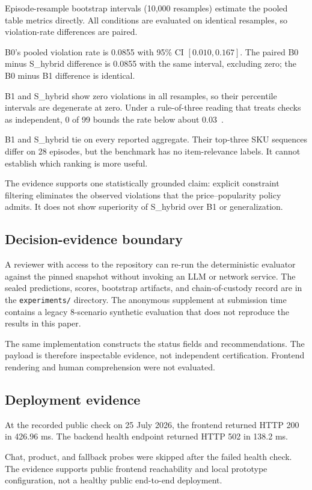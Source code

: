 \documentclass[conference,a4paper]{IEEEtran}
\begin{document}
Episode-resample bootstrap intervals (10{,}000 resamples) estimate the pooled table metrics directly. All conditions are evaluated on identical resamples, so violation-rate differences are paired.

B0's pooled violation rate is 0.0855 with 95\% CI $[0.010, 0.167]$. The paired B0 minus S\_hybrid difference is 0.0855 with the same interval, excluding zero; the B0 minus B1 difference is identical.

B1 and S\_hybrid show zero violations in all resamples, so their percentile intervals are degenerate at zero. Under a rule-of-three reading that treats checks as independent, 0 of 99 bounds the rate below about 0.03~\cite{hanley1983zero}.

B1 and S\_hybrid tie on every reported aggregate. Their top-three SKU sequences differ on 28 episodes, but the benchmark has no item-relevance labels. It cannot establish which ranking is more useful.

The evidence supports one statistically grounded claim: explicit constraint filtering eliminates the observed violations that the price--popularity policy admits. It does not show superiority of S\_hybrid over B1 or generalization.

\subsection{Decision-evidence boundary}
A reviewer with access to the repository can re-run the deterministic evaluator against the pinned snapshot without invoking an LLM or network service. The sealed predictions, scores, bootstrap artifacts, and chain-of-custody record are in the \texttt{experiments/} directory. The anonymous supplement at submission time contains a legacy 8-scenario synthetic evaluation that does not reproduce the results in this paper.

The same implementation constructs the status fields and recommendations. The payload is therefore inspectable evidence, not independent certification. Frontend rendering and human comprehension were not evaluated.

\subsection{Deployment evidence}
At the recorded public check on 25 July 2026, the frontend returned HTTP 200 in 426.96 ms. The backend health endpoint returned HTTP 502 in 138.2 ms.

Chat, product, and fallback probes were skipped after the failed health check. The evidence supports public frontend reachability and local prototype configuration, not a healthy public end-to-end deployment.
\end{document}
